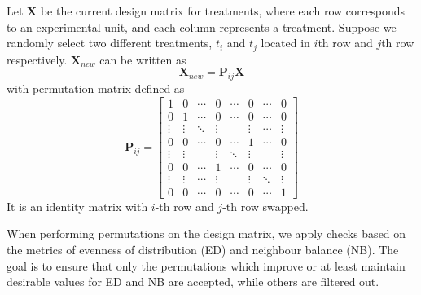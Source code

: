 \documentclass[
  a4paper,
  oneside,
  openany,
  12pt,
  onecolumn]{book}
\theoremstyle{definition}
\theoremstyle{definition}
\theoremstyle{plain}
\theoremstyle{remark}
\begin{document}
Let \(\boldsymbol{X}\) be the current design matrix for treatments,
where each row corresponds to an experimental unit, and each column
represents a treatment. Suppose we randomly select two different
treatments, \(t_i\) and \(t_j\) located in \(i\)th row and \(j\)th row
respectively. \(\boldsymbol{X}_{new}\) can be written as \[
\boldsymbol{X}_{new} = \boldsymbol{P}_{ij}\boldsymbol{X}
\] with permutation matrix defined as \[
 \boldsymbol{P}_{i j}=\left[
 \begin{array}{cccccccc}
 1 & 0 & \cdots & 0 & \cdots & 0 & \cdots & 0 \\ 
 0 & 1 & \cdots & 0 & \cdots &0 & \cdots & 0 \\ 
 \vdots & \vdots & \ddots & \vdots & & \vdots & \cdots & \vdots \\ 
 0 & 0 & \cdots & 0 & \cdots & 1 & \cdots & 0 \\
 \vdots & \vdots & & \vdots & \ddots & \vdots & & \vdots\\
 0 & 0 & \cdots & 1 & \cdots & 0 & \cdots & 0 \\ 
 \vdots & \vdots & \cdots & \vdots & & \vdots & \ddots & \vdots \\ 
 0 & 0 & \cdots & 0 & \cdots & 0 & \cdots & 1
 \end{array}\right] 
\] It is an identity matrix with \(i\)-th row and \(j\)-th row swapped.

When performing permutations on the design matrix, we apply checks based
on the metrics of evenness of distribution (ED) and neighbour balance
(NB). The goal is to ensure that only the permutations which improve or
at least maintain desirable values for ED and NB are accepted, while
others are filtered out.
\end{document}

